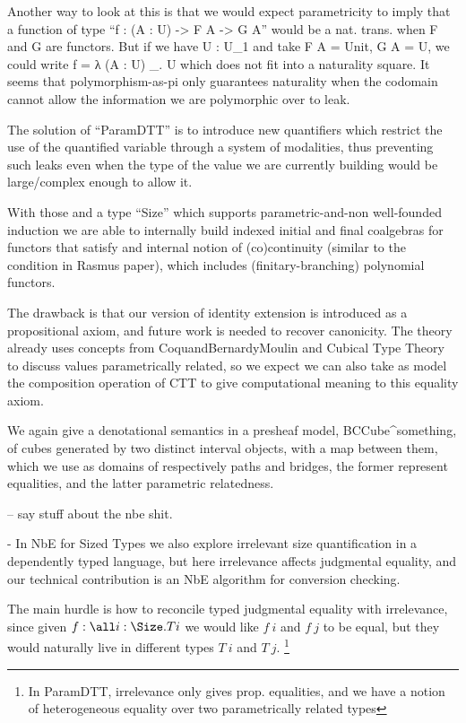     Another way to look at this is that we would expect parametricity
    to imply that a function of type ``f : (A : U) -> F A -> G A''
    would be a nat. trans. when F and G are functors.  But if we have
    U : U_1 and take F A = Unit, G A = U, we could write
    f = λ (A : U) _. U which does not fit into a naturality square.
    It seems that polymorphism-as-pi only guarantees naturality when
    the codomain cannot allow the information we are polymorphic over
    to leak.

    The solution of ``ParamDTT'' is to introduce new quantifiers which
    restrict the use of the quantified variable through a system of
    modalities, thus preventing such leaks even when the type of the
    value we are currently building would be large/complex enough to
    allow it.

    With those and a type ``Size'' which supports parametric-and-non
    well-founded induction we are able to internally build indexed
    initial and final coalgebras for functors that satisfy and
    internal notion of (co)continuity (similar to the condition in
    Rasmus paper), which includes (finitary-branching) polynomial
    functors.

    The drawback is that our version of identity extension is
    introduced as a propositional axiom, and future work is needed to
    recover canonicity. The theory already uses concepts from
    CoquandBernardyMoulin and Cubical Type Theory to discuss values
    parametrically related, so we expect we can also take as model the
    composition operation of CTT to give computational meaning to this
    equality axiom.

    We again give a denotational semantics in a presheaf model,
    BCCube^\hat something, of cubes generated by two distinct interval
    objects, with a map between them, which we use as domains of
    respectively paths and bridges, the former represent equalities,
    and the latter parametric relatedness.

    -- say stuff about the nbe shit.
    
    - In NbE for Sized Types we also explore irrelevant size
    quantification in a dependently typed language, but here
    irrelevance affects judgmental equality, and our technical
    contribution is an NbE algorithm for conversion checking.
    
    The main hurdle is how to reconcile typed judgmental equality with
    irrelevance, since given $f : \all i : \Size. T i$ we would like
    $f~i$ and $f~j$ to be equal, but they would naturally live in
    different types $T~i$ and $T~j$.
    \footnote{In ParamDTT, irrelevance only gives prop. equalities,
      and we have a notion of heterogeneous equality over two
      parametrically related types}
    
